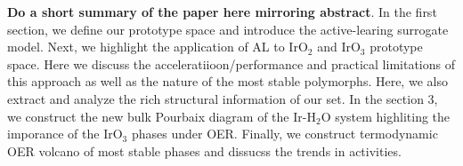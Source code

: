{\bf Do a short summary of the paper here mirroring abstract}. In the first section, we define our prototype space and introduce the active-learing surrogate model. Next, we highlight the application of AL to  IrO$_2$ and  IrO$_3$ prototype space. Here we discuss the acceleratiioon/performance and practical limitations of this approach as well as the nature of the most stable polymorphs. Here, we also extract and analyze the rich structural information of our set. In the section 3, we construct the new bulk Pourbaix diagram of the Ir-H$_2$O system highliting the imporance of the IrO$_3$ phases under OER. Finally, we construct termodynamic OER volcano of most stable phases and dissucss the trends in activities.         









